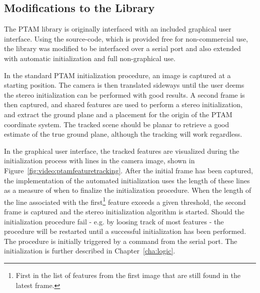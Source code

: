         \subsection{Modifications to the Library}
            The PTAM library is originally interfaced with an included graphical user interface.
            Using the source-code, which is provided free for non-commercial use, the
            library was modified to be interfaced over a serial port
            and also extended with automatic initialization and full non-graphical use.

            In the standard PTAM initialization procedure, an image is captured
            at a starting position. The camera is then translated sideways until the user
            deems the stereo initialization can be performed with good results.
            A second frame is then captured, and shared features are used
            to perform a stereo initialization, and extract the ground plane
            and a placement for the origin of the PTAM coordinate system.
            The tracked scene should be planar to retrieve a good estimate
            of the true ground plane, although the tracking will work regardless.


            In the graphical user interface, the tracked features are visualized
            during the initialization process with lines in the camera image,
            shown in Figure~\ref{fig:video:ptamfeaturetracking}.
            After the initial frame has been captured, the implementation
            of the automated initialization uses the length of these lines as
            a measure of when to finalize the initialization procedure.
            When the length of the line associated with the first\footnote{First in the list of features from the first image that are still found in the latest frame.}
            feature exceeds a given threshold, the second frame is
            captured and the stereo initialization algorithm is started.
            Should the initialization procedure fail - e.g. by loosing track of most features - the
            procedure will be restarted until a successful initialization has been performed.
            The procedure is initially triggered by a command from the serial port.
            The initialization is further described in Chapter~\ref{cha:logic}.


